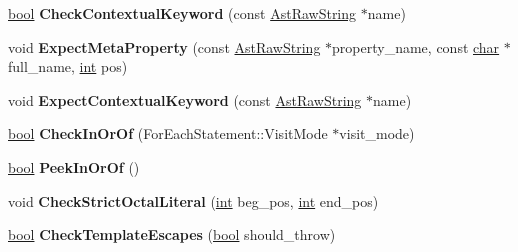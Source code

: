 \begin{DoxyCompactItemize}
\mbox{\label{classv8_1_1internal_1_1ParserBase_a88f35787bd60ac15cad7dbea6a8579bb}} 
\mbox{\hyperlink{classbool}{bool}} {\bfseries Check\+Contextual\+Keyword} (const \mbox{\hyperlink{classv8_1_1internal_1_1AstRawString}{Ast\+Raw\+String}} $\ast$name)
\item 
\mbox{\label{classv8_1_1internal_1_1ParserBase_a0dcc8efe73d91144dd11c28a4eb81302}} 
void {\bfseries Expect\+Meta\+Property} (const \mbox{\hyperlink{classv8_1_1internal_1_1AstRawString}{Ast\+Raw\+String}} $\ast$property\+\_\+name, const \mbox{\hyperlink{classchar}{char}} $\ast$full\+\_\+name, \mbox{\hyperlink{classint}{int}} pos)
\item 
\mbox{\label{classv8_1_1internal_1_1ParserBase_a38b0bc2f49a6bfa393c14811084166d2}} 
void {\bfseries Expect\+Contextual\+Keyword} (const \mbox{\hyperlink{classv8_1_1internal_1_1AstRawString}{Ast\+Raw\+String}} $\ast$name)
\item 
\mbox{\label{classv8_1_1internal_1_1ParserBase_a11d7c8593e51e04ed9b021f2c9fab045}} 
\mbox{\hyperlink{classbool}{bool}} {\bfseries Check\+In\+Or\+Of} (For\+Each\+Statement\+::\+Visit\+Mode $\ast$visit\+\_\+mode)
\item 
\mbox{\label{classv8_1_1internal_1_1ParserBase_a2d3effe7526837d987639a58cab5e488}} 
\mbox{\hyperlink{classbool}{bool}} {\bfseries Peek\+In\+Or\+Of} ()
\item 
\mbox{\label{classv8_1_1internal_1_1ParserBase_a2d0dda812229ac8219f000261604bf82}} 
void {\bfseries Check\+Strict\+Octal\+Literal} (\mbox{\hyperlink{classint}{int}} beg\+\_\+pos, \mbox{\hyperlink{classint}{int}} end\+\_\+pos)
\item 
\mbox{\label{classv8_1_1internal_1_1ParserBase_ad7c634fdcf8479d13d0467993f4199a7}} 
\mbox{\hyperlink{classbool}{bool}} {\bfseries Check\+Template\+Escapes} (\mbox{\hyperlink{classbool}{bool}} should\+\_\+throw)
\item 
\mbox{\label{classv8_1_1internal_1_1ParserBase_a51d1373a55e3dce8014c7edda0aca09d}} 

\end{DoxyCompactItemize}
